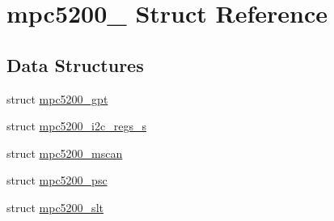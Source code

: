 \hypertarget{structmpc5200__}{}\section{mpc5200\+\_\+ Struct Reference}
\label{structmpc5200__}
\subsection*{Data Structures}
\begin{DoxyCompactItemize}
\item 
struct \mbox{\hyperlink{structmpc5200___1_1mpc5200__gpt}{mpc5200\+\_\+gpt}}
\item 
struct \mbox{\hyperlink{structmpc5200___1_1mpc5200__i2c__regs__s}{mpc5200\+\_\+i2c\+\_\+regs\+\_\+s}}
\item 
struct \mbox{\hyperlink{structmpc5200___1_1mpc5200__mscan}{mpc5200\+\_\+mscan}}
\item 
struct \mbox{\hyperlink{structmpc5200___1_1mpc5200__psc}{mpc5200\+\_\+psc}}
\item 
struct \mbox{\hyperlink{structmpc5200___1_1mpc5200__slt}{mpc5200\+\_\+slt}}
\end{DoxyCompactItemize}
